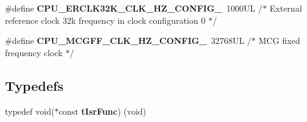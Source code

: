\begin{DoxyCompactItemize}
\item 
\hypertarget{group___cpu__module_ga092702a75fd1041eb311850abb022240}{}\#define {\bfseries C\+P\+U\+\_\+\+E\+R\+C\+L\+K32\+K\+\_\+\+C\+L\+K\+\_\+\+H\+Z\+\_\+\+C\+O\+N\+F\+I\+G\+\_}~1000\+U\+L /$\ast$ External reference clock 32k frequency in clock configuration 0 $\ast$/\label{group___cpu__module_ga092702a75fd1041eb311850abb022240}

\item 
\hypertarget{group___cpu__module_gafd8ec2ac4ea47574f95d0e5a6f80807e}{}\#define {\bfseries C\+P\+U\+\_\+\+M\+C\+G\+F\+F\+\_\+\+C\+L\+K\+\_\+\+H\+Z\+\_\+\+C\+O\+N\+F\+I\+G\+\_}~32768\+U\+L /$\ast$ M\+C\+G fixed frequency clock $\ast$/\label{group___cpu__module_gafd8ec2ac4ea47574f95d0e5a6f80807e}

\end{DoxyCompactItemize}
\subsection*{Typedefs}
\begin{DoxyCompactItemize}
\item 
\hypertarget{group___cpu__module_gafea04d3e8135767c03ce099f02e97437}{}typedef void($\ast$const {\bfseries t\+Isr\+Func}) (void)\label{group___cpu__module_gafea04d3e8135767c03ce099f02e97437}

\end{DoxyCompactItemize}
